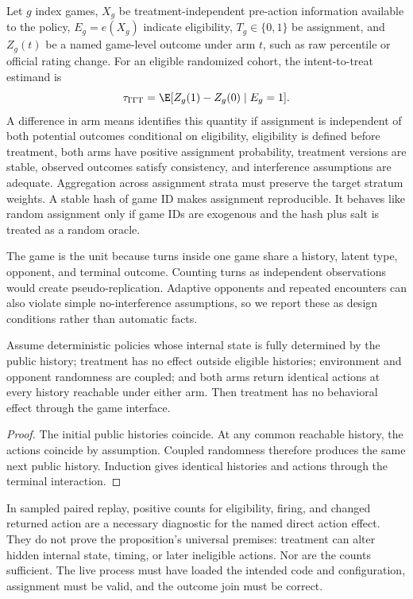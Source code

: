 Let $g$ index games, $X_g$ be treatment-independent pre-action information
available to the policy, $E_g=e(X_g)$ indicate
eligibility, $T_g\in\{0,1\}$ be assignment, and $Z_g(t)$ be a named game-level
outcome under arm $t$, such as raw percentile or official rating change. For an eligible randomized cohort, the intent-to-treat
estimand is
\begin{equation}
\tau_{\mathrm{ITT}}=\E[Z_g(1)-Z_g(0)\mid E_g=1].
\end{equation}
A difference in arm means identifies this quantity if assignment is independent
of both potential outcomes conditional on eligibility, eligibility is defined
before treatment, both arms have positive assignment probability, treatment
versions are stable, observed outcomes satisfy consistency, and interference
assumptions are adequate. Aggregation across assignment strata must preserve
the target stratum weights. A stable hash of game ID makes assignment
reproducible. It behaves like random assignment only if game IDs are exogenous
and the hash plus salt is treated as a random oracle.

The game is the unit because turns inside one game share a history, latent type,
opponent, and terminal outcome. Counting turns as independent observations
would create pseudo-replication. Adaptive opponents and repeated encounters can
also violate simple no-interference assumptions, so we report these as design
conditions rather than automatic facts.

\begin{proposition}
Assume deterministic policies whose internal state is fully determined by the
public history; treatment has no effect outside eligible histories; environment
and opponent randomness are coupled; and both arms return identical actions at
every history reachable under either arm. Then treatment has no behavioral
effect through the game interface.
\end{proposition}
\begin{proof}
The initial public histories coincide. At any common reachable history, the
actions coincide by assumption. Coupled randomness therefore produces the same
next public history. Induction gives identical histories and actions through the
terminal interaction.
\end{proof}

In sampled paired replay, positive counts for eligibility, firing, and changed
returned action are a necessary diagnostic for the named direct action effect.
They do not prove the proposition's universal premises: treatment can alter
hidden internal state, timing, or later ineligible actions. Nor are the counts
sufficient. The live process must have loaded the intended code and
configuration, assignment must be valid, and the outcome join must be correct.

